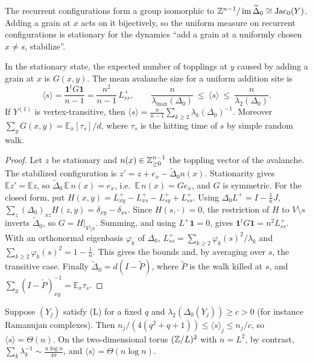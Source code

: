 \begin{proposition}\label{V3P2:prop:dhar}
The recurrent configurations form a group isomorphic to
$\mathbb{Z}^{n-1}/\operatorname{im}\widetilde\Delta_0\cong\operatorname{Jac}_0(Y)$. Adding a grain at $x$ acts on it
bijectively, so the uniform measure on recurrent configurations is stationary for the
dynamics ``add a grain at a uniformly chosen $x\neq s$, stabilize''.
\end{proposition}

\begin{theorem}\label{V3P2:thm:mean}
In the stationary state, the expected number of topplings at $y$ caused by adding a grain at
$x$ is $G(x,y)$. The mean avalanche size for a uniform addition site is
\[
\langle s\rangle=\frac{\mathbf 1^{t}G\mathbf 1}{n-1}=\frac{n^{2}}{n-1}\,L^{+}_{ss},
\qquad
\frac{n}{\lambda_{\max}(\Delta_0)}\ \le\ \langle s\rangle\ \le\ \frac{n}{\lambda_2(\Delta_0)} .
\]
If $Y^{(1)}$ is vertex-transitive, then
$\langle s\rangle=\frac{n}{n-1}\sum_{k\ge2}\lambda_k(\Delta_0)^{-1}$.
Moreover $\sum_yG(x,y)=\mathbb E_x[\tau_s]/d$, where $\tau_s$ is the hitting time of $s$ by
simple random walk.
\end{theorem}

\begin{proof}
Let $z$ be stationary and $n(x)\in\mathbb{Z}_{\ge0}^{n-1}$ the toppling vector of the avalanche. The
stabilized configuration is $z'=z+e_x-\widetilde\Delta_0n(x)$. Stationarity gives
$\mathbb Ez'=\mathbb Ez$, so $\widetilde\Delta_0\,\mathbb E\,n(x)=e_x$, i.e.\
$\mathbb E\,n(x)=Ge_x$, and $G$ is symmetric. For the closed form, put
$H(x,y)=L^{+}_{xy}-L^{+}_{xs}-L^{+}_{sy}+L^{+}_{ss}$. Using
$\Delta_0L^{+}=I-\frac1nJ$,
$\sum_z(\Delta_0)_{xz}H(z,y)=\delta_{xy}-\delta_{xs}$. Since $H(s,\cdot)=0$, the restriction
of $H$ to $V\setminus s$ inverts $\widetilde\Delta_0$, so $G=H|_{V\setminus s}$. Summing, and
using $L^{+}\mathbf 1=0$, gives $\mathbf 1^{t}G\mathbf 1=n^{2}L^{+}_{ss}$. With an orthonormal
eigenbasis $\varphi_k$ of $\Delta_0$,
$L^{+}_{ss}=\sum_{k\ge2}\varphi_k(s)^{2}/\lambda_k$ and
$\sum_{k\ge2}\varphi_k(s)^{2}=1-\frac1n$. This gives the bounds and, by averaging over $s$,
the transitive case. Finally
$\widetilde\Delta_0=d(I-\widetilde P)$, where $\widetilde P$ is the walk killed at $s$, and
$\sum_y(I-\widetilde P)^{-1}_{xy}=\mathbb E_x\tau_s$.
\end{proof}

\begin{corollary}\label{V3P2:cor:linear}
Suppose $(Y_j)$ satisfy \textup{(L)} for a fixed $q$ and $\lambda_2(\Delta_0(Y_j))\ge c>0$
(for instance Ramanujan complexes). Then
$n_j/(4(q^{2}+q+1))\le\langle s\rangle_j\le n_j/c$, so $\langle s\rangle=\Theta(n)$. On the
two-dimensional torus $(\mathbb{Z}/L)^{2}$ with $n=L^{2}$, by contrast, $\sum_k\lambda_k^{-1}\sim
\frac{n\log n}{4\pi}$, and $\langle s\rangle=\Theta(n\log n)$.
\end{corollary}

